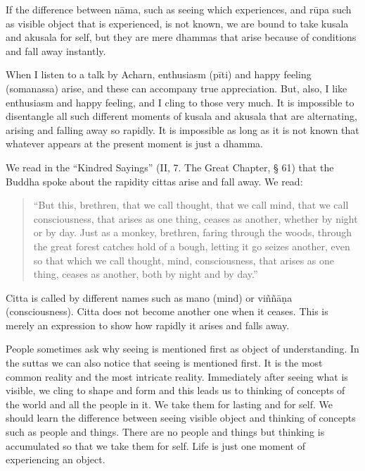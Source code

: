 If the difference between nāma, such as seeing which experiences, and
rūpa such as visible object that is experienced, is not known, we are
bound to take kusala and akusala for self, but they are mere dhammas
that arise because of conditions and fall away instantly.

When I listen to a talk by Acharn, enthusiasm (pīti) and happy feeling
(somanassa) arise, and these can accompany true appreciation. But, also,
I like enthusiasm and happy feeling, and I cling to those very much. It
is impossible to disentangle all such different moments of kusala and
akusala that are alternating, arising and falling away so rapidly. It is
impossible as long as it is not known that whatever appears at the
present moment is just a dhamma.

We read in the ``Kindred Sayings'' (II, 7. The Great Chapter, § 61) that
the Buddha spoke about the rapidity cittas arise and fall away. We read:

\begin{quote}
``But this, brethren, that we call thought, that we call mind, that we
call consciousness, that arises as one thing, ceases as another, whether
by night or by day. Just as a monkey, brethren, faring through the
woods, through the great forest catches hold of a bough, letting it go
seizes another, even so that which we call thought, mind, consciousness,
that arises as one thing, ceases as another, both by night and by day.''
\end{quote}

Citta is called by different names such as mano (mind) or viññāṇa
(consciousness). Citta does not become another one when it ceases. This
is merely an expression to show how rapidly it arises and falls away.

People sometimes ask why seeing is mentioned first as object of
understanding. In the suttas we can also notice that seeing is mentioned
first. It is the most common reality and the most intricate reality.
Immediately after seeing what is visible, we cling to shape and form and
this leads us to thinking of concepts of the world and all the people in
it. We take them for lasting and for self. We should learn the
difference between seeing visible object and thinking of concepts such
as people and things. There are no people and things but thinking is
accumulated so that we take them for self. Life is just one moment of
experiencing an object.

